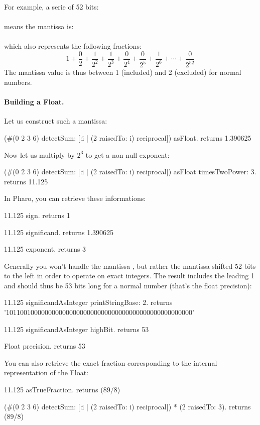 \documentclass[a4paper,10pt,twoside]{book}
\begin{document}
For example, a serie of 52 bits:\\
\\
 means the mantissa is:\\
 \\
 which also represents the following fractions:  \[ 1 + \frac{0}{2} +  \frac{1}{2^2} +  \frac{1}{2^3} +  \frac{0}{2^4} +  \frac{0}{2^5} +  \frac{1}{2^6} + \cdots  +  \frac{0}{2^{52}} \]
The mantissa value is thus between 1 (included) and 2 (excluded) for normal numbers.



\paragraph{Building a Float.}
Let us construct such a mantissa:
\begin{code}{}
(#(0 2 3 6) detectSum: [:i | (2 raisedTo: i) reciprocal]) asFloat.
	returns 1.390625
\end{code}

Now let us multiply by $2^3$ to get a non null exponent:
\begin{code}{}
(#(0 2 3 6) detectSum: [:i | (2 raisedTo: i) reciprocal]) asFloat timesTwoPower: 3.
	returns 11.125
\end{code}

In Pharo, you can retrieve these informations:
 \begin{code}{}
11.125 sign.
	returns 1
	
11.125 significand.
	returns 1.390625
	
11.125 exponent.
	returns 3
\end{code}

Generally you won't handle the mantissa , but rather the mantissa shifted 52 bits to the left in order to operate on exact integers. The result includes the leading 1 and should thus be 53 bits long for a normal number (that's the float precision):
 \begin{code}{}
11.125 significandAsInteger printStringBase: 2.
	returns '10110010000000000000000000000000000000000000000000000'
	
11.125 significandAsInteger highBit.
	returns 53
	
Float precision.
	returns 53
\end{code}

You can also retrieve the exact fraction corresponding to the internal representation of the Float:
 \begin{code}{}
 11.125 asTrueFraction.
	returns  (89/8)

(#(0 2 3 6) detectSum: [:i | (2 raisedTo: i) reciprocal]) * (2 raisedTo: 3).
	returns  (89/8)
\end{code}
\end{document}
